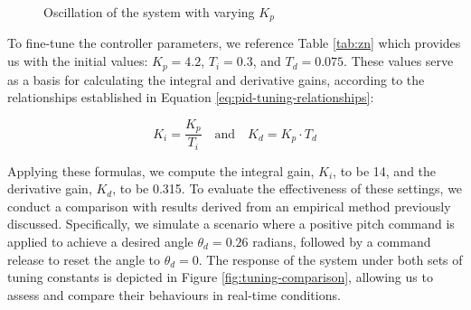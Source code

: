 \documentclass[12pt]{article}
\begin{document}
\begin{figure}[ht]
\begin{subfigure}{.4\textwidth}
\end{subfigure}
    \caption{Oscillation of the system with varying $K_p$}
    \label{fig:zn-tuning}
\end{figure}

To fine-tune the controller parameters, we reference Table \ref{tab:zn} which provides us with the initial values: \(K_p = 4.2\), \(T_i = 0.3\), and \(T_d = 0.075\). These values serve as a basis for calculating the integral and derivative gains, according to the relationships established in Equation \ref{eq:pid-tuning-relationships}:

\begin{equation}
    \label{eq:pid-tuning-relationships}
    K_i = \frac{K_p}{T_i}
    \quad \text{and} \quad
    K_d = K_p \cdot T_d
\end{equation}

Applying these formulas, we compute the integral gain, \(K_i\), to be 14, and the derivative gain, \(K_d\), to be 0.315. To evaluate the effectiveness of these settings, we conduct a comparison with results derived from an empirical method previously discussed. Specifically, we simulate a scenario where a positive pitch command is applied to achieve a desired angle \(\theta_d = 0.26\) radians, followed by a command release to reset the angle to \(\theta_d = 0\). The response of the system under both sets of tuning constants is depicted in Figure \ref{fig:tuning-comparison}, allowing us to assess and compare their behaviours in real-time conditions.
\end{document}
